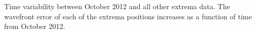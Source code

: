 Time variability between October 2012 and all other extrema data. The wavefront error of each of the extrema positions increases as a function of time from October 2012.
    